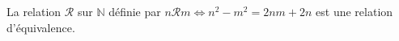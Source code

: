 La relation $\mathcal R$ sur $\mathbb N$ définie par $n\mathcal R m \iff n^2-m^2 = 2nm+2n$ est une relation d'équivalence.

\begin{reponses}
\end{reponses}

